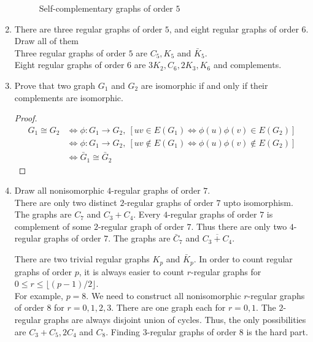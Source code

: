 \begin{enumerate}
\begin{figure}[hbt]
	\caption{Self-complementary graphs of order $5$}
	\label{dia:sc5}
	\end{figure}
	\item There are three regular graphs of order $5$, and eight regular graphs of order $6$. Draw all of them\\
		Three regular graphs of order $5$ are $C_5,K_5$ and $\bar{K}_5$.\\
		Eight regular graphs of order $6$ are $3K_2,C_6,2K_3,K_6$ and complements.
	\item Prove that two graph $G_1$ and $G_2$ are isomorphic if and only if their complements are isomorphic.
	\begin{proof}
	\begin{align*}
	G_1 \cong G_2 
		& \iff \phi : G_1 \to G_2,\ \left[uv \in E(G_1) \iff  \phi(u)\phi(v) \in E(G_2)\right] \\
		& \iff \phi : G_1 \to G_2,\ \left[uv \notin E(G_1) \iff \phi(u)\phi(v) \notin E(G_2)\right] \\
		& \iff \bar{G}_1 \cong \bar{G}_2
	\end{align*}
	\end{proof}
	\item Draw all nonisomorphic $4$-regular graphs of order $7$.\\
		There are only two distinct $2$-regular graphs of order $7$ upto isomorphism. The graphs are $C_7$ and $C_3+C_4$. Every $4$-regular graphs of order $7$ is complement of some $2$-regular graph of order $7$. Thus there are only two $4$-regular graphs of order $7$. The graphs are $\bar{C}_7$ and $\overline{C_3+C_4}$.

\begin{commentary}
	There are two trivial regular graphs $K_p$ and $\bar{K}_p$. In order to count regular graphs of order $p$, it is always easier to count $r$-regular graphs for $0 \le r \le \lfloor (p-1)/2 \rfloor$.\\

	For example, $p=8$. We need to construct all nonisomorphic $r$-regular graphs of order $8$ for $r=0,1,2,3$. There are one graph each for $r=0,1$. The $2$-regular graphs are always disjoint union of cycles. Thus, the only possibilities are $C_3+C_5, 2C_4$ and $C_8$. Finding $3$-regular graphs of order $8$ is the hard part.\\


\end{commentary}
\end{enumerate}
